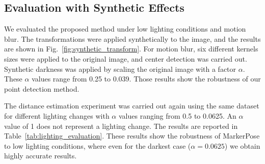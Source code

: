 \documentclass[final]{cvpr}
\begin{document}
\begin{table}[h]
\caption{Rotation experiment: metrics of the distance between the centers $c_0$ and $c_1$, and the centers $c_0$ and $c_2$, using the frames acquired for angle estimation.}
\label{tab:rot_metrics_points}
\end{table}

\subsection{Evaluation with Synthetic Effects}
We evaluated the proposed method under low lighting conditions and motion blur. The transformations were applied synthetically to the image, and the results are shown in Fig.~\ref{fig:synthetic_transform}. For motion blur, six different kernels sizes were applied to the original image, and center detection was carried out. Synthetic darkness was applied by scaling the original image with a factor $\alpha$. These $\alpha$ values range from 0.25 to 0.039. Those results show the robustness of our point detection method.

The distance estimation experiment was carried out again using the same dataset for different lighting changes with $\alpha$ values ranging from 0.5 to 0.0625. An $\alpha$ value of 1 does not represent a lighting change. The results are reported in Table~\ref{tab:lighting_evaluation}. These results show the robustness of MarkerPose to low lighting conditions, where even for the darkest case ($\alpha = 0.0625$) we obtain highly accurate results.
\end{document}
